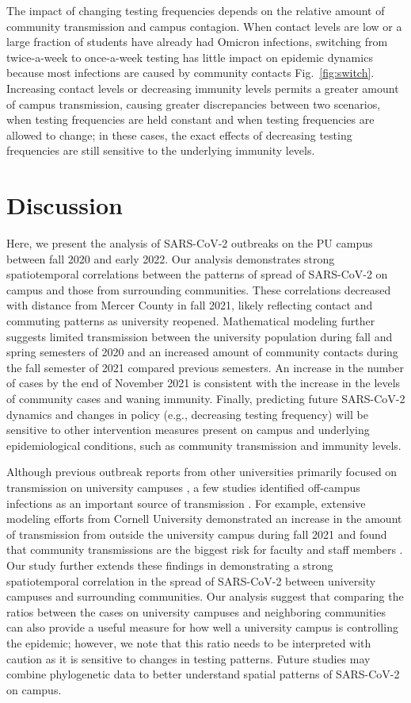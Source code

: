 \documentclass[12pt]{article}
\newcommand{\fref}[1]{Fig.~\ref{fig:#1}}
\begin{document}
The impact of changing testing frequencies depends on the relative amount of community transmission and campus contagion.
When contact levels are low or a large fraction of students have already had Omicron infections, switching from twice-a-week to once-a-week testing has little impact on epidemic dynamics because most infections are caused by community contacts \fref{switch}.
Increasing contact levels or decreasing immunity levels permits a greater amount of campus transmission, causing greater discrepancies between two scenarios, when testing frequencies are held constant and when testing frequencies are allowed to change;
in these cases, the exact effects of decreasing testing frequencies are still sensitive to the underlying immunity levels.

\section*{Discussion}

Here, we present the analysis of SARS-CoV-2 outbreaks on the PU campus between fall 2020 and early 2022.
Our analysis demonstrates strong spatiotemporal correlations between the patterns of spread of SARS-CoV-2 on campus and those from surrounding communities.
These correlations decreased with distance from Mercer County in fall 2021, likely reflecting contact and commuting patterns as university reopened.
Mathematical modeling further suggests limited transmission between the university population during fall and spring semesters of 2020 and an increased amount of community contacts during the fall semester of 2021 compared previous semesters.
An increase in the number of cases by the end of November 2021 is consistent with the increase in the levels of community cases and waning immunity.
Finally, predicting future SARS-CoV-2 dynamics and changes in policy (e.g., decreasing testing frequency) will be sensitive to other intervention measures present on campus and underlying epidemiological conditions, such as community transmission and immunity levels.

Although previous outbreak reports from other universities primarily focused on transmission on university campuses \citep{wilson2020multiple,currie2021interventions}, a few studies identified off-campus infections as an important source of transmission \citep{fox2021response,hamer2021assessment}.
For example, extensive modeling efforts from Cornell University demonstrated an increase in the amount of transmission from outside the university campus during fall 2021 and found that community transmissions are the biggest risk for faculty and staff members \citep{frazier2022modeling}.
Our study further extends these findings in demonstrating a strong spatiotemporal correlation in the spread of SARS-CoV-2 between university campuses and surrounding communities.
Our analysis suggest that comparing the ratios between the cases on university campuses and neighboring communities can also provide a useful measure for how well a university campus is controlling the epidemic; 
however, we note that this ratio needs to be interpreted with caution as it is sensitive to changes in testing patterns.
Future studies may combine phylogenetic data to better understand spatial patterns of SARS-CoV-2 on campus.
\end{document}
